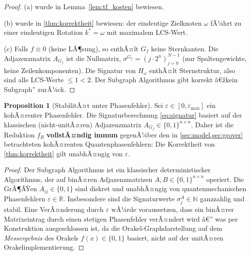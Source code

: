 ﻿\documentclass[11pt,a4paper]{article}
\theoremstyle{definition}
\newtheorem{proposition}[theorem]{Proposition}
\begin{document}
\begin{proof}
  (a) wurde in Lemma~\ref{lem:tf_kosten} bewiesen.

  (b) wurde in \cref{thm:korrektheit} bewiesen: der eindeutige Zielknoten $\omega$
  fÃ¼hrt zu einer eindeutigen Rotation $k^* = \omega$ mit maximalem LCS-Wert.

  (c) Falls $f \equiv 0$ (keine LÃ¶sung), so enthÃ¤lt $G_f$ keine Sternkanten.
  Die Adjazenzmatrix $A_{G_f}$ ist die Nullmatrix, $\sigma^{G_f} = (j \cdot 2^n)_{j=0}^{N-1}$
  (nur Spaltengewichte, keine Zeilenkomponenten).  Die Signatur von $H_\omega$
  enthÃ¤lt Sternstruktur, also sind alle LCS-Werte $\leq 1 < 2$.
  Der Subgraph Algorithmus gibt korrekt â€žkein Subgraph'' zurÃ¼ck.
\end{proof}

\begin{proposition}[StabilitÃ¤t unter Phasenfehler]
\label{prop:phasenstabilitaet}
  Sei $\varepsilon \in [0, \varepsilon_{\max}]$ ein kohÃ¤renter Phasenfehler.
  Die Signaturberechnung \eqref{eq:signatur} basiert auf der klassischen
  (nicht-unitÃ¤ren) Adjazenzmatrix $A_{G_f} \in \{0,1\}^{n \times n}$.
  Daher ist die Reduktion $f_R$ \textbf{vollstÃ¤ndig immun} gegenÃ¼ber den
  in \cref{sec:model,sec:grover} betrachteten kohÃ¤renten Quantenphasenfehlern:
  Die Korrektheit von \cref{thm:korrektheit} gilt unabhÃ¤ngig von $\varepsilon$.
\end{proposition}

\begin{proof}
  Der Subgraph Algorithmus \cite{Epp2026} ist ein klassischer deterministischer
  Algorithmus, der auf binÃ¤ren Adjazenzmatrizen $A, B \in \{0,1\}^{n\times n}$
  operiert.  Die GrÃ¶ÃŸen $A_{ij} \in \{0,1\}$ sind diskret und unabhÃ¤ngig von
  quantenmechanischen Phasenfehlern $\varepsilon \in \mathbb{R}$.
  Insbesondere sind die Signaturwerte $\sigma_j^A \in \mathbb{N}$ ganzzahlig
  und stabil.  Eine VerÃ¤nderung durch $\varepsilon$ wÃ¼rde voraussetzen, dass
  ein binÃ¤rer Matrixeintrag durch einen stetigen Phasenfehler verÃ¤ndert wird â€”
  was per Konstruktion ausgeschlossen ist, da die Orakel-Graphdarstellung
  auf dem \emph{Messergebnis} des Orakels $f(x) \in \{0,1\}$ basiert, nicht
  auf der unitÃ¤ren Orakelimplementierung.
\end{proof}

\end{document}
